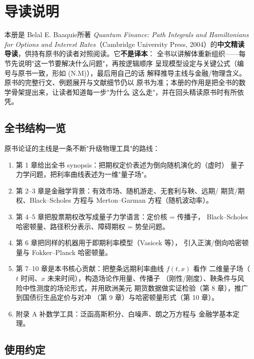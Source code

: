 \chapter*{导读说明}

本册是 Belal E. Baaquie所著 \emph{Quantum Finance: Path Integrals and
Hamiltonians for Options and Interest Rates}（Cambridge University Press,
2004）的\textbf{中文精读导读}，供持有原书的读者对照阅读。它\textbf{不是译本}：
全书以讲解体重新组织——每节先说明"这一节要解决什么问题"，再按逻辑顺序
呈现模型设定与关键公式（编号与原书一致，形如 (N.M)），最后用自己的话
解释推导主线与金融/物理含义。原书的完整行文、例题展开与文献细节仍以
原书为准；本册的作用是把全书的数学骨架提出来，让读者知道每一步"为什么
这么走"，并在回头精读原书时有所依凭。

\section*{全书结构一览}

原书论证的主线是一条不断"升级物理工具"的路线：

\begin{enumerate}[itemsep=0.2em]
\item 第 1 章给出全书 synopsis：把期权定价表述为倒向随机演化的（虚时）
      量子力学问题，把利率曲线表述为一维"量子场"。
\item 第 2--3 章是金融学背景：有效市场、随机游走、无套利与鞅、远期/
      期货/期权、Black--Scholes 方程与 Merton--Garman 方程（随机波动率）。
\item 第 4--5 章把股票期权改写成量子力学语言：定价核 = 传播子，
      Black--Scholes 哈密顿量、路径积分表示、障碍期权 = 势垒问题。
\item 第 6 章把同样的机器用于即期利率模型（Vasicek 等），
      引入正演/倒向哈密顿量与 Fokker--Planck 哈密顿量。
\item 第 7--10 章是本书核心贡献：把整条远期利率曲线 $f(t,x)$ 看作
      二维量子场（$t$ 时间、$x$ 未来时间），构造场论作用量、传播子
      （刚性/刚度）、鞅条件与风险中性测度的场论形式，并用欧洲美元
      期货数据做实证检验（第 8 章），推广到国债衍生品定价与对冲
      （第 9 章）与哈密顿量形式（第 10 章）。
\item 附录 A 补数学工具：泛函高斯积分、白噪声、朗之万方程与
      金融学基本定理。
\end{enumerate}

\section*{使用约定}

